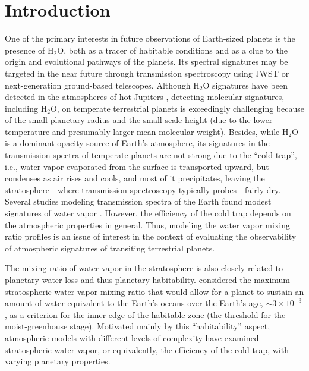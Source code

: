 \documentclass[11pt,numberedappendix,twocolappendix,]{emulateapj}
\def\water{H$_2$O}
\def\wv{water vapor}
\begin{document}



\section{Introduction}
\label{s:intro}

One of the primary interests in future observations of Earth-sized planets is the presence of \water{}, both as a tracer of habitable conditions and as a clue to the origin and evolutional pathways of the planets. 
Its spectral signatures may be targeted in the near future through transmission spectroscopy using JWST or next-generation ground-based telescopes.
%
Although \water{} signatures have been detected in the atmospheres of hot Jupiters \citep[e.g.][]{Tinetti2007,Sing2016}, detecting molecular signatures, including \water{}, on temperate terrestrial planets is exceedingly challenging \citep{Cowan2015} because of the small planetary radius and the small scale height (due to the lower temperature and presumably larger mean molecular weight). 
Besides, while \water{} is a dominant opacity source of Earth's atmosphere, its signatures in the transmission spectra of temperate planets are not strong due to the ``cold trap'', i.e., \wv{} evaporated from the surface is transported upward, but condenses as air rises and cools, and most of it precipitates, leaving the stratosphere---where transmission spectroscopy typically probes---fairly dry. 
Several studies modeling transmission spectra of the Earth found modest signatures of \wv{} \citep[e.g.][]{Ehrenreich2006, Kaltenegger2009, Betremieux2013, Misra2014}. 
However, the efficiency of the cold trap depends on the atmospheric properties in general. 
Thus, modeling the \wv{} mixing ratio profiles is an issue of interest in the context of evaluating the observability of atmospheric signatures of transiting terrestrial planets. 

The mixing ratio of \wv{} in the stratosphere is also closely related to planetary water loss and thus planetary habitability. 
\citet{Kasting1993} considered the maximum stratospheric \wv{} mixing ratio that would allow for a planet to sustain an amount of water equivalent to the  Earth's oceans over the Earth's age, $\sim 3 \times 10^{-3}$, as a criterion for the inner edge of the habitable zone (the threshold for the moist-greenhouse stage). 
Motivated mainly by this ``habitability'' aspect, atmospheric models with different levels of complexity have examined stratospheric \wv{}, or equivalently, the efficiency of the cold trap, with varying planetary properties. 
\end{document}
